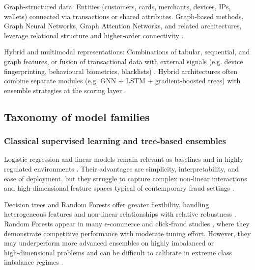 \documentclass[a4paper,fleqn]{cas-dc}
\begin{document}
Graph‑structured data: Entities (customers, cards, merchants, devices, IPs, wallets) connected via transactions or shared attributes. 
Graph‑based methods, Graph Neural Networks, Graph Attention Networks, and related architectures, leverage relational structure and higher‑order connectivity \cite{boyapati_balancergnn_2025, van_belle_shine_2024, li_fedgat-dcnn_2024}.

Hybrid and multimodal representations: Combinations of tabular, sequential, and graph features, or fusion of transactional data with external signals (e.g. device fingerprinting, behavioural biometrics, blacklists) \cite{wu_heterogeneous_2024, alarfaj_enhancing_2025, ileberi_hybrid_2024, sivasubramanian_predicting_2024, zhang_multi-view_2025}. 
Hybrid architectures often combine separate modules (e.g. GNN + LSTM + gradient‑boosted trees) with ensemble strategies at the scoring layer \cite{wu_heterogeneous_2024, akour_hybrid_2025, ileberi_hybrid_2024, krishnavardhan_intelligent_2024}.

\subsection{Taxonomy of model families}
\label{sec:model-families}

\subsubsection{Classical supervised learning and tree‑based ensembles}
Logistic regression and linear models remain relevant as baselines and in highly regulated environments \cite{iqbal_time_2024, chhabra_voting_2023, el_barakaz_optimization_2022, plakandaras_credit_2022}. 
Their advantages are simplicity, interpretability, and ease of deployment, but they struggle to capture complex non‑linear interactions and high‑dimensional feature spaces typical of contemporary fraud settings \cite{iqbal_efficient_2025}.

Decision trees and Random Forests offer greater flexibility, handling heterogeneous features and non‑linear relationships with relative robustness \cite{blaszczynski_auto_2021, korkoman_evolutionary_2023}. 
Random Forests appear in many e‑commerce and click‑fraud studies \cite{xie_enhanced_2023}, where they demonstrate competitive performance with moderate tuning effort. 
However, they may underperform more advanced ensembles on highly imbalanced or high‑dimensional problems and can be difficult to calibrate in extreme class imbalance regimes \cite{van_belle_shine_2024}.
\end{document}
